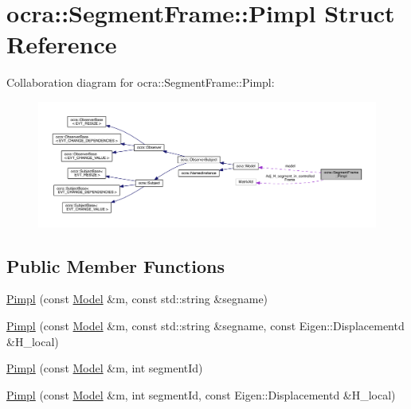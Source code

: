 \hypertarget{structocra_1_1SegmentFrame_1_1Pimpl}{}\section{ocra\+:\+:Segment\+Frame\+:\+:Pimpl Struct Reference}
\label{structocra_1_1SegmentFrame_1_1Pimpl}


Collaboration diagram for ocra\+:\+:Segment\+Frame\+:\+:Pimpl\+:\nopagebreak
\begin{figure}[H]
\begin{center}
\leavevmode
\includegraphics[width=350pt]{dc/d06/structocra_1_1SegmentFrame_1_1Pimpl__coll__graph}
\end{center}
\end{figure}
\subsection*{Public Member Functions}
\begin{DoxyCompactItemize}
\item 
\hyperlink{structocra_1_1SegmentFrame_1_1Pimpl_a3e4a372b7ffde0baf617f8097a4d9285}{Pimpl} (const \hyperlink{classocra_1_1Model}{Model} \&m, const std\+::string \&segname)
\item 
\hyperlink{structocra_1_1SegmentFrame_1_1Pimpl_a419d287d9da1582ff94dd9c3ab539f2b}{Pimpl} (const \hyperlink{classocra_1_1Model}{Model} \&m, const std\+::string \&segname, const Eigen\+::\+Displacementd \&H\+\_\+local)
\item 
\hyperlink{structocra_1_1SegmentFrame_1_1Pimpl_a0de56572f8a4d14450c37bd71e432f2e}{Pimpl} (const \hyperlink{classocra_1_1Model}{Model} \&m, int segment\+Id)
\item 
\hyperlink{structocra_1_1SegmentFrame_1_1Pimpl_a6bc146a3436c88655f79afd8bf7a46b3}{Pimpl} (const \hyperlink{classocra_1_1Model}{Model} \&m, int segment\+Id, const Eigen\+::\+Displacementd \&H\+\_\+local)
\end{DoxyCompactItemize}
